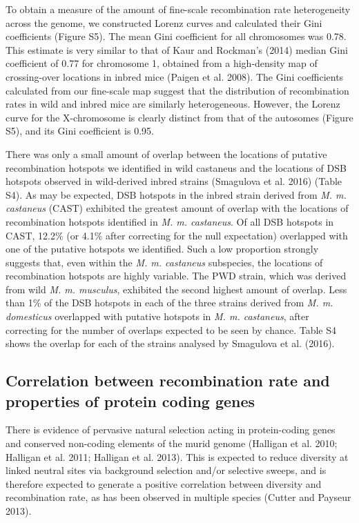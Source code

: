 	To obtain a measure of the amount of fine-scale recombination rate heterogeneity across the genome, we constructed Lorenz curves and calculated their Gini coefficients (Figure S5). The mean Gini coefficient for all chromosomes was 0.78. This estimate is very similar to that of Kaur and Rockman’s (2014) median Gini coefficient of 0.77 for chromosome 1, obtained from a high-density map of crossing-over locations in inbred mice (Paigen et al. 2008). The Gini coefficients calculated from our fine-scale map suggest that the distribution of recombination rates in wild and inbred mice are similarly heterogeneous. However, the Lorenz curve for the X-chromosome is clearly distinct from that of the autosomes (Figure S5), and its Gini coefficient is 0.95. 

There was only a small amount of overlap between the locations of putative recombination hotspots we identified in wild castaneus and the locations of DSB hotspots observed in wild-derived inbred strains (Smagulova et al. 2016) (Table S4). As may be expected, DSB hotspots in the inbred strain derived from \textit{M. m. castaneus} (CAST) exhibited the greatest amount of overlap with the locations of recombination hotspots identified in \textit{M. m. castaneus}. Of all DSB hotspots in CAST, 12.2\% (or 4.1\% after correcting for the null expectation) overlapped with one of the putative hotspots we identified. Such a low proportion strongly suggests that, even within the \textit{M. m. castaneus} subspecies, the locations of recombination hotspots are highly variable. The PWD strain, which was derived from wild \textit{M. m. musculus}, exhibited the second highest amount of overlap. Less than 1\% of the DSB hotspots in each of the three strains derived from \textit{M. m. domesticus} overlapped with putative hotspots in \textit{M. m. castaneus}, after correcting for the number of overlaps expected to be seen by chance. Table S4 shows the overlap for each of the strains analysed by Smagulova et al. (2016).

\subsection{Correlation between recombination rate and properties of protein coding genes}

	There is evidence of pervasive natural selection acting in protein-coding genes and conserved non-coding elements of the murid genome (Halligan et al. 2010; Halligan et al. 2011; Halligan et al. 2013). This is expected to reduce diversity at linked neutral sites via background selection and/or selective sweeps, and is therefore expected to generate a positive correlation between diversity and recombination rate, as has been observed in multiple species (Cutter and Payseur 2013). 

